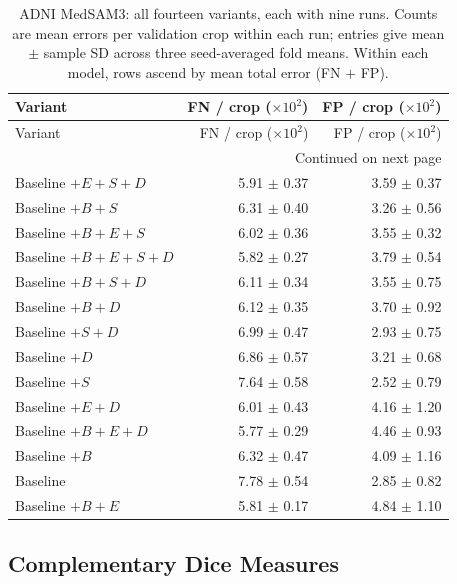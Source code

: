 \documentclass[12pt,a4paper]{article}
\begin{document}
\begingroup\footnotesize{}
\setlength{\tabcolsep}{4pt}
\renewcommand{\arraystretch}{1.12}
\begin{longtable}{@{}lrr@{}}
\caption{ADNI MedSAM3: all fourteen variants, each with nine runs. Counts are mean errors per validation crop within each run; entries give mean $\pm$ sample SD across three seed-averaged fold means. Within each model, rows ascend by mean total error (FN $+$ FP).}
\label{tab:medsam-adni-all-errors}\\
\hline
Variant & \shortstack{FN / crop\\($\times 10^{2}$)} & \shortstack{FP / crop\\($\times 10^{2}$)} \\ \hline
\endfirsthead
\hline
Variant & \shortstack{FN / crop\\($\times 10^{2}$)} & \shortstack{FP / crop\\($\times 10^{2}$)} \\ \hline
\endhead
\hline
\multicolumn{3}{r}{Continued on next page}\\
\endfoot
\hline\endlastfoot
Baseline $+E+S+D$ & 5.91 $\pm$ 0.37 & 3.59 $\pm$ 0.37 \\
Baseline $+B+S$ & 6.31 $\pm$ 0.40 & 3.26 $\pm$ 0.56 \\
Baseline $+B+E+S$ & 6.02 $\pm$ 0.36 & 3.55 $\pm$ 0.32 \\
Baseline $+B+E+S+D$ & 5.82 $\pm$ 0.27 & 3.79 $\pm$ 0.54 \\
Baseline $+B+S+D$ & 6.11 $\pm$ 0.34 & 3.55 $\pm$ 0.75 \\
Baseline $+B+D$ & 6.12 $\pm$ 0.35 & 3.70 $\pm$ 0.92 \\
Baseline $+S+D$ & 6.99 $\pm$ 0.47 & 2.93 $\pm$ 0.75 \\
Baseline $+D$ & 6.86 $\pm$ 0.57 & 3.21 $\pm$ 0.68 \\
Baseline $+S$ & 7.64 $\pm$ 0.58 & 2.52 $\pm$ 0.79 \\
Baseline $+E+D$ & 6.01 $\pm$ 0.43 & 4.16 $\pm$ 1.20 \\
Baseline $+B+E+D$ & 5.77 $\pm$ 0.29 & 4.46 $\pm$ 0.93 \\
Baseline $+B$ & 6.32 $\pm$ 0.47 & 4.09 $\pm$ 1.16 \\
Baseline & 7.78 $\pm$ 0.54 & 2.85 $\pm$ 0.82 \\
Baseline $+B+E$ & 5.81 $\pm$ 0.17 & 4.84 $\pm$ 1.10 \\
\end{longtable}
\endgroup
\FloatBarrier
\subsection{Complementary Dice Measures}
\end{document}
